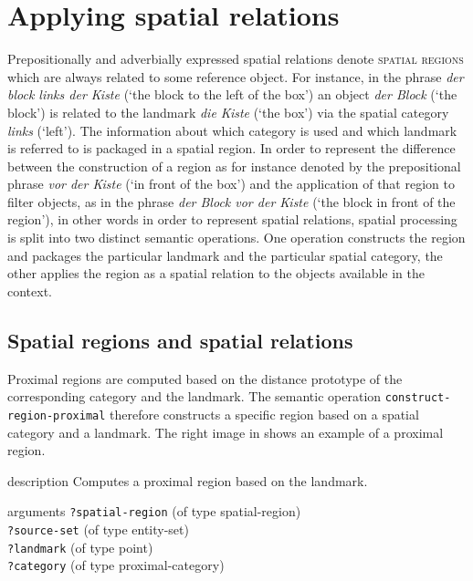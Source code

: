 \section{Applying spatial relations}
Prepositionally and adverbially expressed spatial relations denote 
\textsc{spatial regions} which are always related to some reference object.
For instance, in the phrase \textit{der block links der Kiste} (`the block to the left
of the box') an object \textit{der Block} (`the block') is related to the landmark 
\textit{die Kiste} (`the box') via the spatial category \textit{links} (`left'). 
The information about which category is used and which landmark
is referred to is packaged in a spatial region.
In order to represent the difference between the construction of a region
as for instance denoted by the prepositional phrase \textit{vor der Kiste}
(`in front of the box') and the application of that region to filter objects,
as in the phrase \textit{der Block vor der Kiste} (`the block in front of the region'),
in other words in order to represent spatial relations, spatial 
processing is split into two distinct semantic operations. One operation
constructs the region and packages the particular landmark and the particular
spatial category, the other applies the region as a spatial relation 
to the objects available in the context.

\subsection{Spatial regions and spatial relations}
Proximal regions are computed based on the distance prototype of the 
corresponding category and the landmark. The semantic operation
{\footnotesize\tt construct-region-proximal} therefore constructs a specific 
region based on a spatial category and a landmark. 
The right image in  
shows an example of a proximal region. 

\begin{explanation}{description}
Computes a proximal region based on the landmark.
\end{explanation}
\begin{explanation}{arguments}
{\footnotesize\verb+?spatial-region+} (of type spatial-region) \\
{\footnotesize\verb+?source-set+} (of type entity-set) \\
{\footnotesize\verb+?landmark+} (of type point)\\
{\footnotesize\verb+?category+} (of type proximal-category)
\vspace{0.3cm}
\end{explanation}

